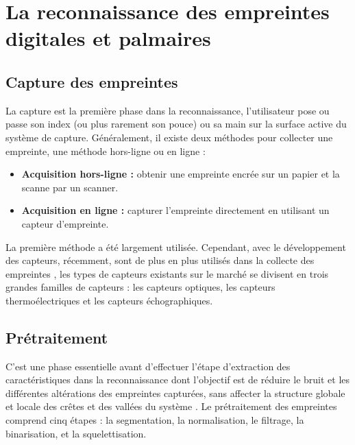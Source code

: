 \chapter{La reconnaissance des empreintes digitales et palmaires} %
\newcommand{\hbAppendixPrefix}{A.}
%
\renewcommand{\thefigure}{\hbAppendixPrefix\arabic{figure}}
\setcounter{figure}{0}
\renewcommand{\thetable}{\hbAppendixPrefix\arabic{table}} 
\setcounter{table}{0}
\renewcommand{\theequation}{\hbAppendixPrefix\arabic{equation}} 
\setcounter{equation}{0}
\label{Appendix1} %


\section{Capture des empreintes}
La capture est la première phase dans la reconnaissance, l’utilisateur pose ou passe son index (ou plus rarement son pouce) ou sa main sur la surface active du système de capture. Généralement, il existe deux méthodes pour collecter une empreinte, une méthode hors-ligne ou en ligne :
\begin{itemize}
	\item \textbf{Acquisition hors-ligne :} obtenir une empreinte encrée sur un papier et la scanne par un scanner.
	\item \textbf{Acquisition en ligne :} capturer l'empreinte  directement en utilisant un capteur d'empreinte.
\end{itemize}
La première méthode a été largement utilisée. Cependant, avec le développement des capteurs, récemment, sont de plus en plus utilisés dans la collecte des empreintes \citep{Bhanu2004}, les types de capteurs existants sur le marché se divisent en trois grandes familles de capteurs : les capteurs optiques, les capteurs thermoélectriques et les capteurs échographiques.
\section{Prétraitement}
\label{pretrait}
C’est une phase essentielle avant d’effectuer l’étape d’extraction des caractéristiques dans la reconnaissance dont l’objectif est de réduire le bruit et les différentes altérations des empreintes capturées, sans affecter la structure globale et locale des crêtes et des vallées du système  \citep{hong1998integrating}. Le prétraitement des empreintes comprend cinq étapes : la segmentation, la normalisation, le filtrage, la binarisation, et la squelettisation. 
